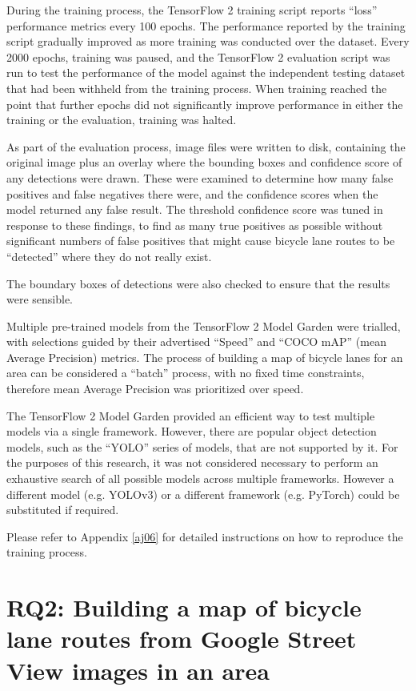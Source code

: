 \documentclass[11pt,twoside]{report}
\begin{document}
During the training process, the TensorFlow 2 training script reports ``loss'' performance metrics every 100 epochs.  The performance reported by the training script gradually improved as more training was conducted over the dataset.  Every 2000 epochs, training was paused, and the TensorFlow 2 evaluation script was run to test the performance of the model against the independent testing dataset that had been withheld from the training process.  When training reached the point that further epochs did not significantly improve performance in either the training or the evaluation, training was halted.

As part of the evaluation process, image files were written to disk, containing the original image plus an overlay where the bounding boxes and confidence score of any detections were drawn.  These were examined to determine how many false positives and false negatives there were, and the confidence scores when the model returned any false result.  The threshold confidence score was tuned in response to these findings, to find as many true positives as possible without significant numbers of false positives that might cause bicycle lane routes to be ``detected'' where they do not really exist.

The boundary boxes of detections were also checked to ensure that the results were sensible.

Multiple pre-trained models from the TensorFlow 2 Model Garden were trialled, with selections guided by their advertised ``Speed'' and ``COCO mAP'' (mean Average Precision) metrics.  The process of building a map of bicycle lanes for an area can be considered a ``batch'' process, with no fixed time constraints, therefore mean Average Precision was prioritized over speed.

The TensorFlow 2 Model Garden provided an efficient way to test multiple models via a single framework.  However, there are popular object detection models, such as the ``YOLO'' series of models, that are not supported by it.  For the purposes of this research, it was not considered necessary to perform an exhaustive search of all possible models across multiple frameworks.  However a different model (e.g. YOLOv3) or a different framework (e.g. PyTorch) could be substituted if required.

Please refer to Appendix \ref{aj06} for detailed instructions on how to reproduce the training process.

\section{RQ2: Building a map of bicycle lane routes from Google Street View images in an area}
\label{s:rq2}
\end{document}

